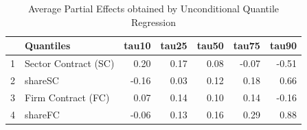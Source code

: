 \begin{landscape}
\begin{table}[]
\scriptsize
\centering
\caption{Average Partial Effects obtained by Unconditional Quantile Regression}\vspace{0.2cm}
\label{APEs:UQRimplement}
\begin{tabular}{rlrrrrr}
  \hline
 & Quantiles & tau10 & tau25 & tau50 & tau75 & tau90 \\
  \hline
1 & Sector Contract (SC) & 0.20 & 0.17 & 0.08 & -0.07 & -0.51 \\
  2 & shareSC & -0.16 & 0.03 & 0.12 & 0.18 & 0.66 \\
  3 & Firm Contract (FC) & 0.07 & 0.14 & 0.10 & 0.14 & -0.16 \\
  4 & shareFC & -0.06 & 0.13 & 0.16 & 0.29 & 0.88 \\
   \hline
\end{tabular}
\end{table}
\end{landscape}


